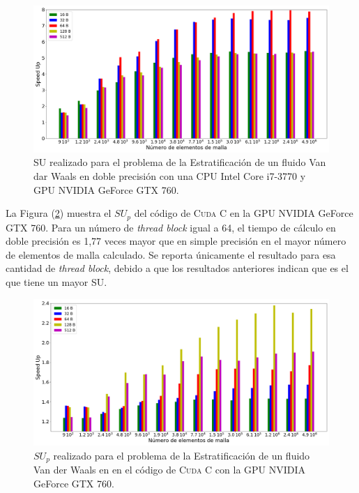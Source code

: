 \begin{figure}[htbp]
	\centering
	\includegraphics[width=\textwidth]{figs_2/cap4/s_760_VdW_double_10}
	\caption{SU realizado para el problema de la Estratificación de un fluido Van dar Waals en doble precisión con una CPU Intel Core i7-3770 y GPU NVIDIA GeForce GTX 760.} 
	\label{fig:s_760_VdW_double_10}	
\end{figure}

La Figura (\ref{fig:c_760_VdW_cuda_10}) muestra el ${SU}_p$ del código de \textsc{Cuda C} en la GPU NVIDIA GeForce GTX 760. Para un número de \textit{thread block} igual a 64, el tiempo de cálculo en doble precisión es 1,77 veces mayor que en simple precisión en el mayor número de elementos de malla calculado. Se reporta únicamente el resultado para esa cantidad de \textit{thread block}, debido a que los resultados anteriores indican que es el que tiene un mayor SU.

\begin{figure}[h!]
	\centering
	\includegraphics[width=\textwidth]{figs_2/cap4/c_760_MxC_cuda_10}
	\caption{$SU_p$ realizado para el problema de la Estratificación de un fluido Van der Waals en en el código de \textsc{Cuda C} con la GPU NVIDIA GeForce GTX 760.} 
	\label{fig:c_760_VdW_cuda_10}	
\end{figure}

